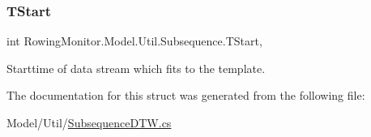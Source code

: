 \subsubsection{\texorpdfstring{T\+Start}{TStart}}
{\footnotesize\ttfamily int Rowing\+Monitor.\+Model.\+Util.\+Subsequence.\+T\+Start\hspace{0.3cm}{\ttfamily [get]}, {\ttfamily [set]}}



Starttime of data stream which fits to the template. 



The documentation for this struct was generated from the following file\+:\begin{DoxyCompactItemize}
\item 
Model/\+Util/\hyperlink{_subsequence_d_t_w_8cs}{Subsequence\+D\+T\+W.\+cs}\end{DoxyCompactItemize}
